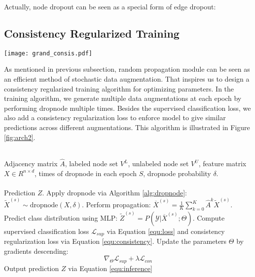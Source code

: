 {{Actually, node dropout can be seen as a special form of edge dropout:
}



\subsection{Consistency Regularized Training}
\label{sec:consis}
\begin{figure*}
	\centering
	\texttt{[image: grand\_consis.pdf]}
	\caption{Illustration of consistency regularized training for \model. }
	\label{fig:arch2}
\end{figure*}
As mentioned in previous subsection, random propagation module can be seen as an efficient method of stochastic data augmentation. That inspires us to design a consistency regularized training algorithm for optimizing parameters. 
  In the training algorithm, we generate multiple data augmentations at each epoch by performing dropnode multiple times. Besides the supervised classification loss, we also add a consistency regularization loss to enforce model to give similar predictions across different augmentations. This algorithm is illustrated in Figure \ref{fig:arch2}.


\begin{algorithm}[tb]
\caption{Consistency Regularized Training for \model}
\label{alg:2}
\begin{algorithmic}[1] \REQUIRE ~~\\
 Adjacency matrix $\hat{A}$,
labeled node set $V^L$,
 unlabeled node set $V^U$,
feature matrix $X \in R^{n \times d}$, 
times of dropnode in each epoch $S$, dropnode probability $\delta$.\\
\ENSURE ~~\\
Prediction $Z$.
\STATE Apply dropnode via Algorithm \ref{alg:dropnode}: $
\widetilde{X}^{(s)} \sim \text{dropnode}(X,\delta)$. 
\STATE Perform propagation: $\overline{X}^{(s)} = \frac{1}{K}\sum_{k=0}^K\hat{A}^k \widetilde{X}^{(s)}$.
\STATE Predict class distribution using MLP: $\widetilde{Z}^{(s)} = P(\mathcal{Y}|\overline{X}^{(s)};\Theta)$.
\ENDFOR
\STATE Compute supervised classification loss $\mathcal{L}_{sup}$ via Equation \ref{equ:loss} and consistency regularization loss via Equation \ref{equ:consistency}.
\STATE Update the parameters $\Theta$ by gradients descending:
$$\nabla_\Theta \mathcal{L}_{sup} + \lambda \mathcal{L}_{con}$$
\ENDWHILE
\STATE Output prediction $Z$ via Equation \ref{equ:inference}
\end{algorithmic}
\end{algorithm}

}
